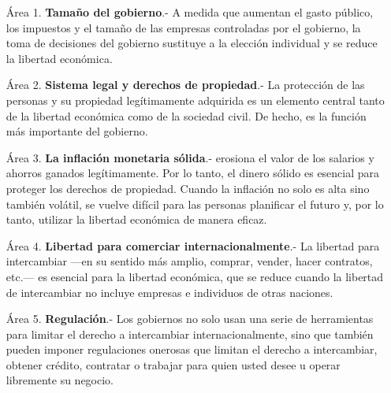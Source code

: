 \begin{enumerate}

    \item[Área 1.] \textbf{Tamaño del gobierno}.- A medida que aumentan el gasto público, los impuestos y el tamaño de las empresas controladas por el gobierno, la toma de decisiones del gobierno sustituye a la elección individual y se reduce la libertad económica.

    \item[Área 2.] \textbf{Sistema legal y derechos de propiedad}.- La protección de las personas y su propiedad legítimamente adquirida es un elemento central tanto de la libertad económica como de la sociedad civil. De hecho, es la función más importante del gobierno.

    \item[Área 3.] \textbf{La inflación monetaria sólida}.- erosiona el valor de los salarios y ahorros ganados legítimamente. Por lo tanto, el dinero sólido es esencial para proteger los derechos de propiedad. Cuando la inflación no solo es alta sino también volátil, se vuelve difícil para las personas planificar el futuro y, por lo tanto, utilizar la libertad económica de manera eficaz.

    \item[Área 4.] \textbf{Libertad para comerciar internacionalmente}.- La libertad para intercambiar —en su sentido más amplio, comprar, vender, hacer contratos, etc.— es esencial para la libertad económica, que se reduce cuando la libertad de intercambiar no incluye empresas e individuos de otras naciones.

    \item[Área 5.] \textbf{Regulación}.- Los gobiernos no solo usan una serie de herramientas para limitar el derecho a intercambiar internacionalmente, sino que también pueden imponer regulaciones onerosas que limitan el derecho a intercambiar, obtener crédito, contratar o trabajar para quien usted desee u operar libremente su negocio.

\end{enumerate}
